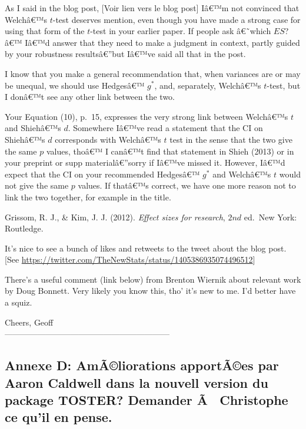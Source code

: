 \begin{appendix}
\color{brown} As I said in the blog post, \color{darkgray} {[}Voir lien
vers le blog post{]} \color{brown} Iâ€™m not convinced that Welchâ€™s
\(t\)-test deserves mention, even though you have made a strong case for
using that form of the \(t\)-test in your earlier paper. If people ask
â€˜which \(ES\)?â€™ Iâ€™d answer that they need to make a judgment in
context, partly guided by your robustness resultsâ€''but Iâ€™ve said all
that in the post.

I know that you make a general recommendation that, when variances are
or may be unequal, we should use Hedgesâ€™ \(g^*\), and, separately,
Welchâ€™s \(t\)-test, but I donâ€™t see any other link between the two.

Your Equation (10), p.~15, expresses the very strong link between
Welchâ€™s \(t\) and Shiehâ€™s \(d\). Somewhere Iâ€™ve read a statement
that the CI on Shiehâ€™s \(d\) corresponds with Welchâ€™s \(t\) test in
the sense that the two give the same \(p\) values, thoâ€™ I canâ€™t find
that statement in Shieh (2013) or in your preprint or supp
materialâ€''sorry if Iâ€™ve missed it. However, Iâ€™d expect that the CI
on your recommended Hedgesâ€™ \(g^*\) and Welchâ€™s \(t\) would not give
the same \(p\) values. If thatâ€™s correct, we have one more reason not
to link the two together, for example in the title.

\color{black} Grissom, R. J., \& Kim, J. J. (2012). \emph{Effect sizes
for research}, \(2{nd}\) ed.~New York: Routledge.

\color{brown} It's nice to see a bunch of likes and retweets to the
tweet about the blog post. \color{darkgray} {[}See
\underline{https://twitter.com/TheNewStats/status/1405386935074496512}{]}

\color{brown} There's a useful comment (link below) from Brenton Wiernik
about relevant work by Doug Bonnett. Very likely you know this, tho'
it's new to me. I'd better have a squiz.

Cheers, Geoff\\
\color{black}
------------------------------------------------------------

\newpage

\hypertarget{annexe-d-amuxe3liorations-apportuxe3es-par-aaron-caldwell-dans-la-nouvell-version-du-package-toster-demander-uxe3-christophe-ce-quil-en-pense.}{%
\subsection{Annexe D: AmÃ©liorations apportÃ©es par Aaron Caldwell dans
la nouvell version du package TOSTER? Demander Ã~ Christophe ce qu'il en
pense.}\label{annexe-d-amuxe3liorations-apportuxe3es-par-aaron-caldwell-dans-la-nouvell-version-du-package-toster-demander-uxe3-christophe-ce-quil-en-pense.}}
\end{appendix}
